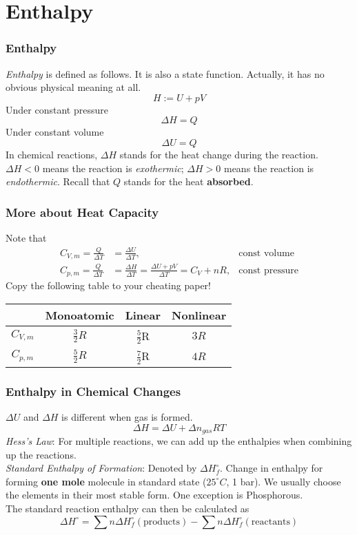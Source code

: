\documentclass[aspectratio=169]{beamer}
\def\blankline{\\[6pt]}
\begin{document}
\section{Enthalpy}
  \begin{frame}
    \frametitle{Enthalpy}
    \textit{Enthalpy} is defined as follows. It is also a state function. Actually, it has no obvious physical meaning at all.
    $$H := U + pV$$
    Under constant pressure
    $$\Delta H = Q$$
    Under constant volume
    $$\Delta U = Q$$
    In chemical reactions, $\Delta H$ stands for the heat change during the reaction. $\Delta H < 0$ means the reaction is \textit{exothermic}; $\Delta H > 0$ means the reaction is \textit{endothermic}. Recall that $Q$ stands for the heat \textbf{absorbed}.
  \end{frame}
  \begin{frame}
    \frametitle{More about Heat Capacity}
    Note that
    \begin{align*}
      C_{V, m} = \frac{Q}{\Delta T} &= \frac{\Delta U}{\Delta T}, &\text{const volume} \\
      C_{p, m} = \frac{Q}{\Delta T} &= \frac{\Delta H}{\Delta T} = \frac{\Delta U + pV}{\Delta T} = C_V + nR, &\text{const pressure}
    \end{align*}
    Copy the following table to your cheating paper!
    \begin{table}[H]
      \centering
      \begin{tabular}{c | c | c | c}
          & Monoatomic & Linear & Nonlinear \\[4pt]
        \hline
        $C_{V, m}$ & $\frac{3}{2}R$ & $\frac{5}{2}$R & $3R$ \\[3pt]
        $C_{p, m}$ & $\frac{5}{2}R$ & $\frac{7}{2}$R & $4R$
      \end{tabular}
    \end{table}
  \end{frame}
  \begin{frame}
    \frametitle{Enthalpy in Chemical Changes}
    $\Delta U$ and $\Delta H$ is different when gas is formed. 
    $$\Delta H = \Delta U + \Delta n_{gas}RT $$
    \textit{Hess's Law}: For multiple reactions, we can add up the enthalpies when combining up the reactions.
    \blankline
    \textit{Standard Enthalpy of Formation}: Denoted by $\Delta H_{f}^{\circ}$. Change in enthalpy for forming \textbf{one mole} molecule in standard state ($25^{\circ}C$, 1 bar). 
    We usually choose the elements in their most stable form. One exception is Phosphorous.
    \blankline
    The standard reaction enthalpy can then be calculated as
    $$\Delta H^{\circ} = \sum n \Delta H_{f}^{\circ}(\text{products}) - \sum n \Delta H_{f}^{\circ}(\text{reactants})$$
  \end{frame}
\end{document}
